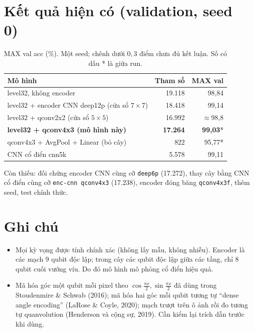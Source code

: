 \documentclass[11pt,a4paper]{article}
\begin{document}
\section{Kết quả hiện có (validation, seed 0)}
\begin{table}[htbp]\centering
\caption{MAX val acc (\%). Một seed; chênh dưới $0{,}3$ điểm chưa đủ kết luận. Số có dấu * là giữa run.}
\begin{tabular}{lrr}
\toprule
Mô hình & Tham số & MAX val \\
\midrule
level32, không encoder & 19.118 & 98,84 \\
level32 + encoder CNN deep12p (cửa sổ $7\times7$) & 18.418 & 99,14 \\
level32 + qconv2x2 (cửa sổ $5\times5$) & 16.992 & $\approx$98,8 \\
\textbf{level32 + qconv4x3 (mô hình này)} & \textbf{17.264} & \textbf{99,03}* \\
qconv4x3 + AvgPool + Linear (bỏ cây) & 822 & 95,77* \\
CNN cổ điển cnn5k & 5.578 & 99,11 \\
\bottomrule
\end{tabular}
\end{table}
Còn thiếu: đối chứng encoder CNN cùng cỡ \texttt{deep6p} (17.272), thay cây bằng CNN cổ điển cùng cỡ
\texttt{enc-cnn qconv4x3} (17.238), encoder đóng băng \texttt{qconv4x3f}, thêm seed, test chính thức.

\section{Ghi chú}
\begin{itemize}[nosep]
\item Mọi kỳ vọng được tính chính xác (không lấy mẫu, không nhiễu). Encoder là các mạch 9 qubit độc lập; trong cây
các qubit độc lập giữa các tầng, chỉ 8 qubit cuối vướng víu. Do đó mô hình mô phỏng cổ điển hiệu quả.
\item Mã hóa góc một qubit mỗi pixel theo $\cos\frac{\pi x}{2}, \sin\frac{\pi x}{2}$ đã dùng trong
Stoudenmire \& Schwab (2016); mã hóa hai góc mỗi qubit tương tự ``dense angle encoding'' (LaRose \& Coyle, 2020);
mạch trượt trên ô ảnh rồi đo tương tự quanvolution (Henderson và cộng sự, 2019). Cần kiểm lại trích dẫn trước khi
dùng.
\end{itemize}
\end{document}

